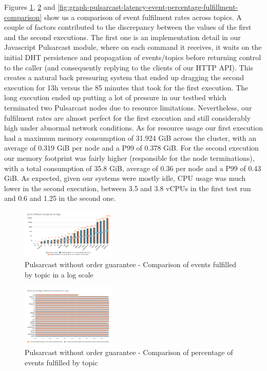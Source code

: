 Figures \ref{fig:graph-pulsarcast-event-fulfillment-comparison},
\ref{fig:graph-pulsarcast-event-percentage-fulfillment-comparison} and
\ref{fig:graph-pulsarcast-latency-event-percentage-fulfillment-comparison} show
us a comparison of event fulfilment rates across topics. A couple of factors
contributed to the discrepancy between the values of the first and the second
executions. The first one is an implementation detail in our Javascript
Pulsarcast module, where on each command it receives, it waits on the initial
DHT persistence and propagation of events/topics before returning control to
the caller (and consequently replying to the clients of our HTTP API). This
creates a natural back pressuring system that ended up dragging the second
execution for 13h versus the 85 minutes that took for the first execution. The
long execution ended up putting a lot of pressure in our testbed which
terminated two Pulsarcast nodes due to resource limitations. Nevertheless, our
fulfilment rates are almost perfect for the first execution and still
considerably high under abnormal network conditions. As for resource usage our
first execution had a maximum memory consumption of 31.924 GiB across the
cluster, with an average of 0.319 GiB per node and a P99 of 0.378 GiB. For the
second execution our memory footprint was fairly higher (responsible for the
node terminations), with a total consumption of 35.8 GiB, average of 0.36 per
node and a P99 of 0.43 GiB. As expected, given our systems were mostly idle,
CPU usage was much lower in the second execution, between 3.5 and 3.8 vCPUs in the
first test run and 0.6 and 1.25 in the second one.

\begin{figure}[!htb]
  \centering
  \includegraphics[width=0.4\textwidth]{img/graph-pulsarcast-event-fulfillment-comparison.png}
  \caption{Pulsarcast without order guarantee - Comparison of events fulfilled by topic in a log scale}
  \label{fig:graph-pulsarcast-event-fulfillment-comparison}
\end{figure}

\begin{figure}[!htb]
  \centering
  \includegraphics[width=0.4\textwidth]{img/graph-pulsarcast-event-percentage-fulfillment-comparison.png}
  \caption{Pulsarcast without order guarantee - Comparison of percentage of events fulfilled by topic}
  \label{fig:graph-pulsarcast-event-percentage-fulfillment-comparison}
\end{figure}


